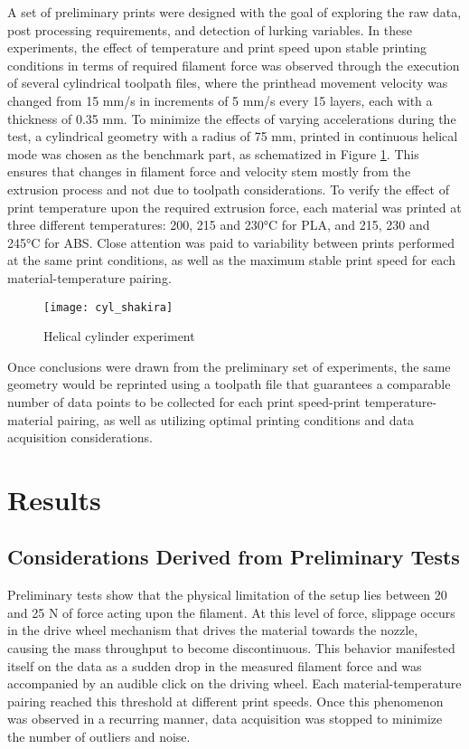 \documentclass[main.tex]{subfiles}
\begin{document}
A set of preliminary prints were designed with the goal of exploring the raw data, post processing requirements, and detection of lurking variables. In these experiments, the effect of temperature and print speed upon stable printing conditions in terms of required filament force was observed through the execution of several cylindrical toolpath files, where the printhead movement velocity was changed from 15 mm/s in increments of 5 mm/s every 15 layers, each with a thickness of 0.35 mm. To minimize the effects of varying accelerations during the test, a cylindrical geometry with a radius of 75 mm, printed in continuous helical mode was chosen as the benchmark part, as schematized in Figure \ref{fig:cyl_shak}. This ensures that changes in filament force and velocity stem mostly from the extrusion process and not due to toolpath considerations. To verify the effect of print temperature upon the required extrusion force, each material was printed at three different temperatures: 200, 215 and 230°C for PLA, and 215, 230 and 245°C for ABS. Close attention was paid to variability between prints performed at the same print conditions, as well as the maximum stable print speed for each material-temperature pairing.

\begin{figure}[!htbp]
	\center
	\texttt{[image: cyl\_shakira]}
	\caption{Helical cylinder experiment} \label{fig:cyl_shak}
\end{figure}

Once conclusions were drawn from the preliminary set of experiments, the same geometry would be reprinted using a toolpath file that guarantees a comparable number of data points to be collected for each print speed-print temperature-material pairing, as well as utilizing optimal printing conditions and data acquisition considerations. 

\section{Results}\label{sec:res_data_ex}
\subsection{Considerations Derived from Preliminary Tests}

Preliminary tests show that the physical limitation of the setup lies between 20 and 25 N of force acting upon the filament. At this level of force, slippage occurs in the drive wheel mechanism that drives the material towards the nozzle, causing the mass throughput to become discontinuous. This behavior manifested itself on the data as a sudden drop in the measured filament force and was accompanied by an audible click on the driving wheel. Each material-temperature pairing reached this threshold at different print speeds. Once this phenomenon was observed in a recurring manner, data acquisition was stopped to minimize the number of outliers and noise.
 
\end{document}

